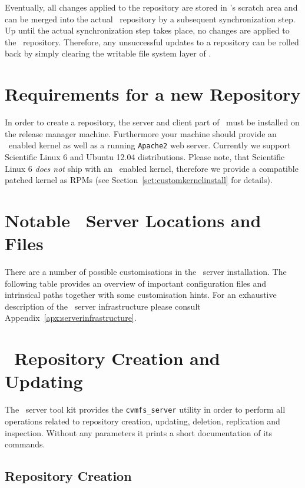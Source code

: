Eventually, all changes applied to the repository are stored in \aufs's scratch area and can be merged into the actual \cvmfs\ repository by a subsequent synchronization step.
Up until the actual synchronization step takes place, no changes are applied to the \cvmfs\ repository.
Therefore, any unsuccessful updates to a repository can be rolled back by simply clearing the writable file system layer of \aufs.

\section{Requirements for a new Repository}
\label{sct:newreporequirements}

In order to create a repository, the server and client part of \cvmfs\ must be installed on the release manager machine.
Furthermore your machine should provide an \aufs\ enabled kernel as well as a running \texttt{Apache2} web server.
Currently we support Scientific Linux 6 and Ubuntu 12.04 distributions.
Please note, that Scientific Linux 6 \emph{does not} ship with an \aufs\ enabled kernel, therefore we provide a compatible patched kernel as RPMs (see Section~\ref{sct:customkernelinstall} for details).


\pagebreak
\section{Notable \cvmfs\ Server Locations and Files}
\label{sct:repoanatomy}
There are a number of possible customisations in the \cvmfs\ server installation.
The following table provides an overview of important configuration files and intrinsical paths together with some customisation hints.
For an exhaustive description of the \cvmfs\ server infrastructure please consult Appendix~\ref{apx:serverinfrastructure}.


\section{\cvmfs\ Repository Creation and Updating}
\label{sct:repocreateandupdate}
The \cvmfs\ server tool kit provides the \texttt{cvmfs\_server} utility in order to perform all operations related to repository creation, updating, deletion, replication and inspection.
Without any parameters it prints a short documentation of its commands.

\subsection{Repository Creation}
\label{sct:repocreation}

